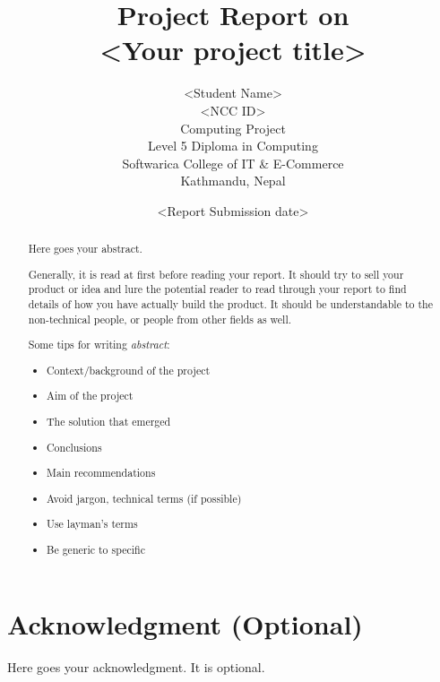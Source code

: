 \documentclass[12pt, a4paper]{report}
\begin{document}
\title{Project Report on\\
\bf{\textless Your project title\textgreater}}
\author{\textless Student Name\textgreater\\
\textless NCC ID\textgreater\\
Computing Project \\
Level 5 Diploma in Computing \\
Softwarica College of IT \& E-Commerce \\
Kathmandu, Nepal
}
\date{\textless Report Submission date\textgreater}


\maketitle



\begin{abstract}
Here goes your abstract.

Generally, it is read at first before reading your report. It should try to sell your product or idea and lure the potential reader to read through your report to find details of how you have actually build the product. It should be understandable to the non-technical people, or people from other fields as well.

Some tips for writing \emph{abstract}:
\begin{itemize}
  \item Context/background of the project
  \item Aim of the project
  \item The solution that emerged
  \item Conclusions
  \item Main recommendations
  \item Avoid jargon, technical terms (if possible)
  \item Use layman's terms
  \item Be generic to specific
\end{itemize}

\end{abstract}

\tableofcontents
\listoftables
\listoffigures

\chapter*{Acknowledgment (Optional)} %
\label{cha:acknowledgment}
Here goes your acknowledgment. It is optional.
\clearpage
{}
\end{document}
